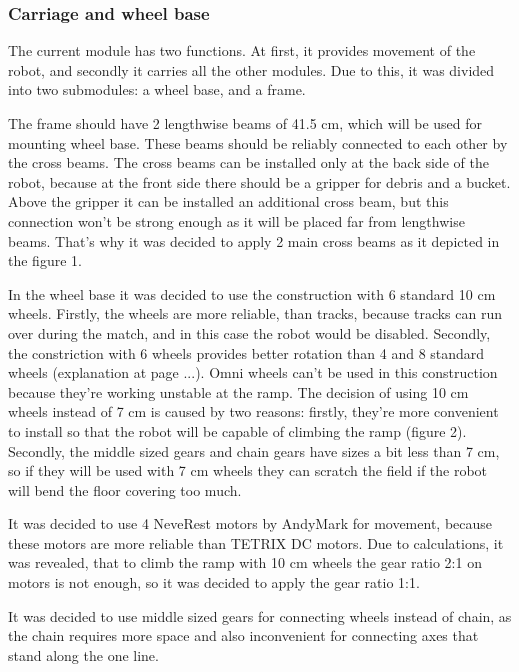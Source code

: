 \subsubsection{Carriage and wheel base}
  
  \begin{enumerate*}
    \item The current module has two functions. At first, it provides movement of the robot, and secondly it carries all the other modules. Due to this, it was divided into two submodules: a wheel base, and a frame.
    
    The frame should have 2 lengthwise beams of 41.5 cm, which will be used for mounting wheel base. These beams should be reliably connected to each other by the cross beams. The cross beams can be installed only at the back side of the robot, because at the front side there should be a gripper for debris and a bucket. Above the gripper it can be installed an additional cross beam, but this connection won't be strong enough as it will be placed far from lengthwise beams. That's why it was decided to apply 2 main cross beams as it depicted in the figure 1. 
    
    In the wheel base it was decided to use the construction with 6 standard 10 cm wheels. Firstly, the wheels are more reliable, than tracks, because tracks can run over during the match, and in this case the robot would be disabled. Secondly, the constriction with 6 wheels provides better rotation than 4 and 8 standard wheels (explanation at page ...). Omni wheels can't be used in this construction because they're working unstable at the ramp. 
    The decision of using 10 cm wheels instead of 7 cm is caused by two reasons: firstly, they're more convenient to install so that the robot will be capable of climbing the ramp (figure 2). Secondly, the middle sized gears and chain gears have sizes a bit less than 7 cm, so if they will be used with 7 cm wheels they can scratch the field if the robot will bend the floor covering too much.
    
    It was decided to use 4 NeveRest motors by AndyMark for movement, because these motors are more reliable than TETRIX DC motors. Due to calculations, it was revealed, that to climb the ramp with 10 cm wheels the gear ratio 2:1 on motors is not enough, so it was decided to apply the gear ratio 1:1.
    
    It was decided to use middle sized gears for connecting wheels instead of chain, as the chain requires more space and also inconvenient for connecting axes that stand along the one line.
    

\end{enumerate*}
